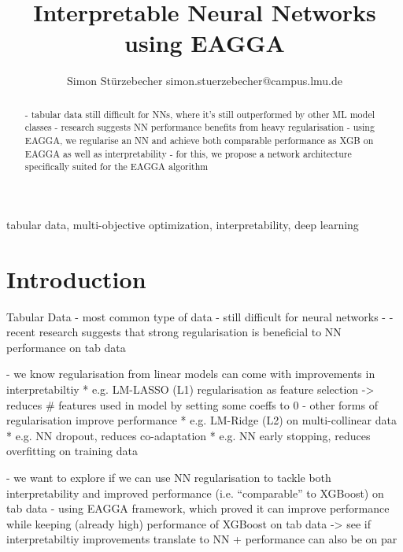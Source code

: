 \documentclass[twoside,11pt]{article}
\begin{document}
\title{Interpretable Neural Networks using EAGGA}

\author{\name Simon Stürzebecher \email simon.stuerzebecher@campus.lmu.de}


\maketitle

\begin{abstract}%
- tabular data still difficult for NNs, where it's still outperformed by other ML model classes
- research suggests NN performance benefits from heavy regularisation
- using EAGGA, we regularise an NN and achieve both comparable performance as XGB on EAGGA as well as interpretability
- for this, we propose a network architecture specifically suited for the EAGGA algorithm
\end{abstract}

\begin{keywords}
  tabular data, multi-objective optimization, interpretability, deep learning
\end{keywords}

\section{Introduction}
Tabular Data
- most common type of data
- still difficult for neural networks
- \citep[p. 7499]{Borisov_2024}
- recent research suggests that strong regularisation is beneficial to NN performance on tab data \citep[8]{NEURIPS2021_c902b497}

- we know regularisation from linear models can come with improvements in interpretabiltiy
  * e.g. LM-LASSO (L1) regularisation as feature selection -> reduces \# features used in model by setting some coeffs to 0 \citep[p. 267]{lasso}
- other forms of regularisation improve performance
  * e.g. LM-Ridge (L2) on multi-collinear data \citep[p. 55]{ridge}  %
  * e.g. NN dropout, reduces co-adaptation \citep[p. 1]{hinton2012improvingneuralnetworkspreventing}
  * e.g. NN early stopping, reduces overfitting on training data \citep[p. 778f]{early_stopping}

- we want to explore if we can use NN regularisation to tackle both interpretability and improved performance (i.e. ``comparable'' to XGBoost) on tab data
- using EAGGA framework, which proved it can improve performance while keeping (already high) performance of XGBoost on tab data -> see if interpretabiltiy
  improvements translate to NN + performance can also be on par
\end{document}
